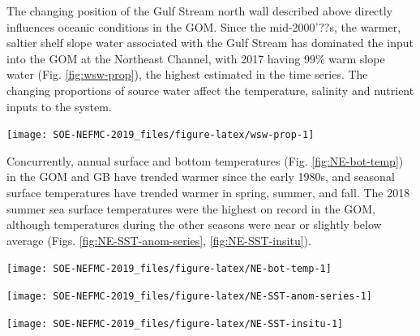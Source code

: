 \documentclass[10pt,]{article}
\let\origfigure\figure
\let\endorigfigure\endfigure
\renewenvironment{figure}[1][2] {
    \expandafter\origfigure\expandafter[H]
} {
    \endorigfigure
}
\begin{document}
The changing position of the Gulf Stream north wall described above
directly influences oceanic conditions in the GOM. Since the
mid-2000'??s, the warmer, saltier shelf slope water associated with the
Gulf Stream has dominated the input into the GOM at the Northeast
Channel, with 2017 having 99\% warm slope water (Fig.
\ref{fig:wsw-prop}), the highest estimated in the time series. The
changing proportions of source water affect the temperature, salinity
and nutrient inputs to the system.

\begin{figure}

{\centering \texttt{[image: SOE-NEFMC-2019\_files/figure-latex/wsw-prop-1]} 

}

\caption{Proportion of warm slope water (WSW) and Labrador slope water (LSLW) entering the GOM through the Northeast Channel.}\label{fig:wsw-prop}
\end{figure}

Concurrently, annual surface and bottom temperatures (Fig.
\ref{fig:NE-bot-temp}) in the GOM and GB have trended warmer since the
early 1980s, and seasonal surface temperatures have trended warmer in
spring, summer, and fall. The 2018 summer sea surface temperatures were
the highest on record in the GOM, although temperatures during the other
seasons were near or slightly below average (Figs.
\ref{fig:NE-SST-anom-series}, \ref{fig:NE-SST-insitu}).

\begin{figure}

{\centering \texttt{[image: SOE-NEFMC-2019\_files/figure-latex/NE-bot-temp-1]} 

}

\caption{GOM and GB annual bottom temperature anomalies.}\label{fig:NE-bot-temp}
\end{figure}

\begin{figure}

{\centering \texttt{[image: SOE-NEFMC-2019\_files/figure-latex/NE-SST-anom-series-1]} 

}

\caption{GOM and GB seasonal sea surface temperature anomaly time series.}\label{fig:NE-SST-anom-series}
\end{figure}

\begin{figure}

{\centering \texttt{[image: SOE-NEFMC-2019\_files/figure-latex/NE-SST-insitu-1]} 

}

\caption{GOM and GB 2018 seasonal sea surface temperature spatial anomalies.}\label{fig:NE-SST-insitu}
\end{figure}
\end{document}
